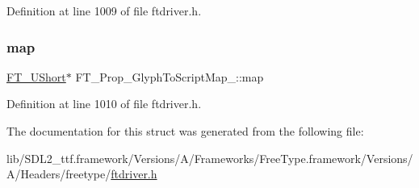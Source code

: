 Definition at line 1009 of file ftdriver.\+h.

\mbox{\label{struct_f_t___prop___glyph_to_script_map___ab7e1c8285f5263a6c4b03ac8d2fb029d}} 
\subsubsection{\texorpdfstring{map}{map}}
{\footnotesize\ttfamily \mbox{\hyperlink{fttypes_8h_a937f6c17cf5ffd09086d8610c37b9f58}{F\+T\+\_\+\+U\+Short}}$\ast$ F\+T\+\_\+\+Prop\+\_\+\+Glyph\+To\+Script\+Map\+\_\+\+::map}



Definition at line 1010 of file ftdriver.\+h.



The documentation for this struct was generated from the following file\+:\begin{DoxyCompactItemize}
\item 
lib/\+S\+D\+L2\+\_\+ttf.\+framework/\+Versions/\+A/\+Frameworks/\+Free\+Type.\+framework/\+Versions/\+A/\+Headers/freetype/\mbox{\hyperlink{ftdriver_8h}{ftdriver.\+h}}\end{DoxyCompactItemize}
